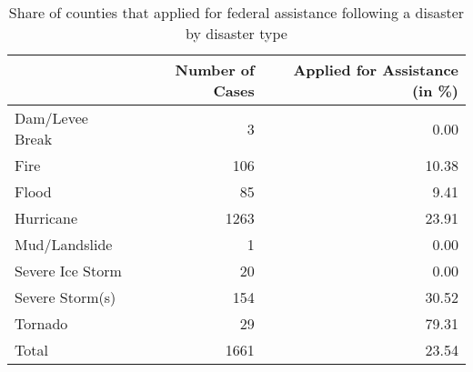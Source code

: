 \begin{table}

\caption{\label{tab:AppsByType}Share of counties that applied for federal assistance following a disaster by disaster type}
\centering
\begin{tabular}[t]{lrr}
\toprule
  & Number of Cases & Applied for Assistance (in \%)\\
\midrule
Dam/Levee Break & 3 & 0.00\\
Fire & 106 & 10.38\\
Flood & 85 & 9.41\\
Hurricane & 1263 & 23.91\\
Mud/Landslide & 1 & 0.00\\
\addlinespace
Severe Ice Storm & 20 & 0.00\\
Severe Storm(s) & 154 & 30.52\\
Tornado & 29 & 79.31\\
Total & 1661 & 23.54\\
\bottomrule
\end{tabular}
\end{table}

